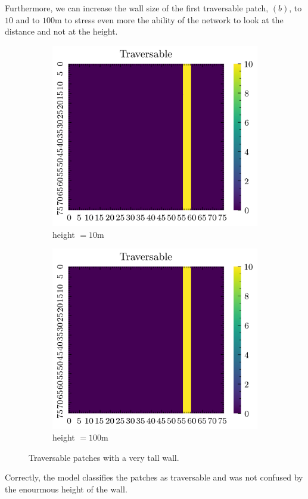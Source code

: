 \documentclass[../document.tex]{subfiles}
\begin{document}
Furthermore, we can increase the wall size of the first traversable patch, $(b)$, to $10$ and to $100$m to stress even more the ability of the network to look at the distance and not at the height.

\begin{figure}[H]
    \centering
    \begin{subfigure}[b]{0.33\textwidth}
        \includegraphics[width=\linewidth]{../img/5/custom_patches/walls_front/big-1-2d.png}
    \caption{height $=10$m}
    \end{subfigure}   
    \begin{subfigure}[b]{0.33\textwidth}
        \includegraphics[width=\linewidth]{../img/5/custom_patches/walls_front/big-1-2d.png}
        \caption{height $=100$m}
    \end{subfigure}   
\caption{Traversable patches with a very tall wall.}    
\end{figure}
Correctly, the model classifies the patches as traversable and was not confused by the enourmous height of the wall.
\end{document}
